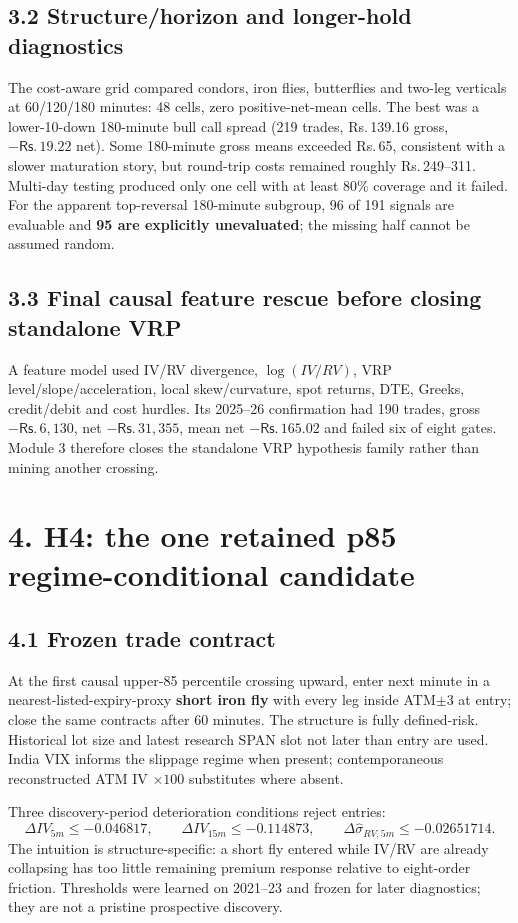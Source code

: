 \documentclass[10pt,a4paper]{article}
\newcommand{\INR}{\textsf{Rs.}\,}
\begin{document}
\subsection*{3.2 Structure/horizon and longer-hold diagnostics}
The cost-aware grid compared condors, iron flies, butterflies and two-leg verticals at 60/120/180 minutes: 48 cells, zero positive-net-mean cells. The best was a lower-10-down 180-minute bull call spread (219 trades, \INR139.16 gross, $-\INR19.22$ net). Some 180-minute gross means exceeded \INR65, consistent with a slower maturation story, but round-trip costs remained roughly \INR249--311. Multi-day testing produced only one cell with at least 80\% coverage and it failed. For the apparent top-reversal 180-minute subgroup, 96 of 191 signals are evaluable and \textbf{95 are explicitly unevaluated}; the missing half cannot be assumed random.

\subsection*{3.3 Final causal feature rescue before closing standalone VRP}
A feature model used IV/RV divergence, $\log(IV/RV)$, VRP level/slope/acceleration, local skew/curvature, spot returns, DTE, Greeks, credit/debit and cost hurdles. Its 2025--26 confirmation had 190 trades, gross $-\INR6,130$, net $-\INR31,355$, mean net $-\INR165.02$ and failed six of eight gates. Module 3 therefore closes the standalone VRP hypothesis family rather than mining another crossing.

\newpage
\section*{4. H4: the one retained p85 regime-conditional candidate}
\subsection*{4.1 Frozen trade contract}
At the first causal upper-85 percentile crossing upward, enter next minute in a nearest-listed-expiry-proxy \textbf{short iron fly} with every leg inside ATM$\pm3$ at entry; close the same contracts after 60 minutes. The structure is fully defined-risk. Historical lot size and latest research SPAN slot not later than entry are used. India VIX informs the slippage regime when present; contemporaneous reconstructed ATM IV $\times100$ substitutes where absent.

Three discovery-period deterioration conditions reject entries:
\[
\Delta IV_{5m}\le -0.046817,\qquad \Delta IV_{15m}\le -0.114873,\qquad
\Delta \widehat\sigma_{RV,5m}\le -0.02651714.
\]
The intuition is structure-specific: a short fly entered while IV/RV are already collapsing has too little remaining premium response relative to eight-order friction. Thresholds were learned on 2021--23 and frozen for later diagnostics; they are not a pristine prospective discovery.
\end{document}
